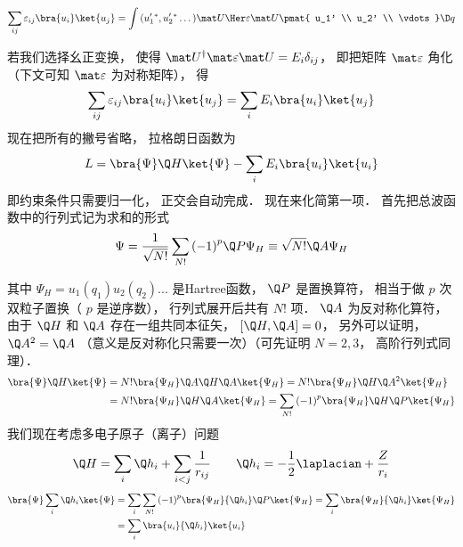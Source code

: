 \begin{equation}
\sum\limits_{ij} { \varepsilon_{ij} \bra{u_i}\ket{u_j} }
= \int {(u'_1{}^* ,u'_2{}^* \dots){\mat U \Her} \varepsilon \mat U
\pmat{ u_1' \\ u_2' \\ \vdots}
\D q}
\end{equation}


若我们选择幺正变换， 使得 ${\mat U^\dag }\mat \varepsilon \mat U = {E_i}{\delta_{ij}}$， %
即把矩阵 $\mat \varepsilon $ 角化（下文可知 $\mat\varepsilon$ 为对称矩阵）， 得
 \begin{equation}
\sum\limits_{ij} {\varepsilon_{ij}} \bra{u_i}\ket{u_j}
 = \sum\limits_i {E_i}  \bra{u_i}\ket{u_j}
\end{equation}
现在把所有的撇号省略， 拉格朗日函数为
\begin{equation}
L =\bra{\Psi}\Q H \ket{\Psi}  - \sum\limits_i E_i \bra{u_i}\ket{u_i}
\end{equation}
即约束条件只需要归一化， 正交会自动完成． 现在来化简第一项． 首先把总波函数中的行列式记为求和的形式
 \begin{equation}
\Psi  = \frac{1}{\sqrt {N!} }\sum\limits_{N!} {{{( - 1)}^p}\Q P{\Psi_H}}  \equiv \sqrt {N!} \Q A{\Psi_H}
\end{equation}

其中 ${\Psi_H} = {u_1}({q_1}){u_2}({q_2})...$ 是Hartree函数，  $\Q P$ 是置换算符， 相当于做 $p$ 次双粒子置换（ $p$ 是逆序数）， 行列式展开后共有 $N!$ 项．  $\Q A$ 为反对称化算符， 由于 $\Q H$ 和 $\Q A$ 存在一组共同本征矢， $[\Q H,\Q A] = 0$，  另外可以证明， ${\Q A^2} = \Q A$ （意义是反对称化只需要一次）（可先证明 $N = 2,3$，  高阶行列式同理）．
\begin{equation}
\begin{aligned}
  \bra{\Psi}\Q H\ket{\Psi}  &= N!\bra{ {\Psi_H}}\Q A\Q H\Q A \ket{\Psi_H} = N!\bra{ {\Psi_H} }\Q H{\Q A^2}\ket{\Psi_H} \\
  &= N!\bra{{\Psi_H} }\Q H\Q A\ket{\Psi_H}   = \sum\limits_{N!} {{( - 1)}^p}\bra{\Psi_H}\Q H\Q P\ket{\Psi_H}\\ 
\end{aligned}
\end{equation}
我们现在考虑多电子原子（离子）问题
\begin{equation}
\Q H = \sum\limits_i {\Q h_i}  + \sum\limits_{i < j} {\frac{1}{r_{ij}}} 
\qquad
{\Q h_i} =  - \frac{1}{2}{\laplacian} + \frac{Z}{r_i}
\end{equation}
\begin{equation}
\begin{aligned}
\bra{\Psi}\sum\limits_i {\Q h_i} \ket{\Psi} & = \sum\limits_i {\sum\limits_{N!} {{{( - 1)}^p}\bra{\Psi_H}{\Q h_i}\Q P \ket{\Psi_H} } }  = \sum\limits_i {\bra{\Psi_H} {\Q h_i} \ket{\Psi_H}}  \\
&= \sum\limits_i {\bra{u_i}{\Q h_i}\ket{u_i}} 
\end{aligned}
\end{equation}
 
